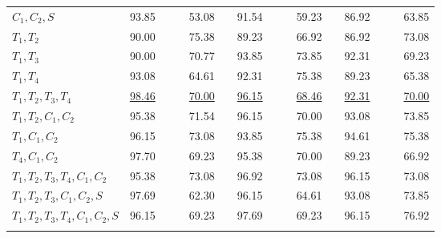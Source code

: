 \begin{table}
{\begin{tabularx}{1.01\textwidth}{@{}l	lllr	 ll	lllr	 ll	lllr@{}}
	$C_1,C_2,S$ 					& 93.85 						& & & 53.08 & \multicolumn{2}{l}{} &  91.54  & & & 59.23 & \multicolumn{2}{l}{} &  86.92 & & & 63.85 \\
	$T_1,T_2$ 					& 90.00 						& & & 75.38 & \multicolumn{2}{l}{} &  89.23  & & & 66.92 & \multicolumn{2}{l}{} &  86.92 & & & 73.08 \\
	$T_1,T_3$ 					& 90.00 						& & & 70.77 & \multicolumn{2}{l}{} &  93.85  & & & 73.85 & \multicolumn{2}{l}{} &   92.31 & & & 69.23  \\
	$T_1,T_4$ 					& 93.08 						& & & 64.61 & \multicolumn{2}{l}{} &  92.31  & & & 75.38 & \multicolumn{2}{l}{} &  89.23 & & & 65.38  \\
	$T_1,T_2,T_3,T_4$  			& \underline{\cellcolor[gray]{0.8}98.46} &\cellcolor[gray]{0.8} & \cellcolor[gray]{0.8}& \underline{\cellcolor[gray]{0.8}70.00}  & \multicolumn{2}{l}{} & \underline{96.15} & & & \underline{68.46} & \multicolumn{2}{l}{} &  \underline{92.31} & & & \underline{70.00}\\
	$T_1,T_2,C_1,C_2$ 			& 95.38 						& & & 71.54  & \multicolumn{2}{l}{} & 96.15 & & & 70.00 & \multicolumn{2}{l}{} &  93.08 & & & 73.85 \\
 	$T_1,C_1,C_2$  				& 96.15						& & & 73.08  & \multicolumn{2}{l}{} & 93.85 & & & 75.38 & \multicolumn{2}{l}{} &  94.61 & & & 75.38 \\ 
 	$T_4,C_1,C_2$ 				& \cellcolor[gray]{0.8}97.70 			& \cellcolor[gray]{0.8}&\cellcolor[gray]{0.8} &\cellcolor[gray]{0.8}69.23  & \multicolumn{2}{l}{} & 95.38 & & & 70.00 & \multicolumn{2}{l}{} &  89.23 & & & 66.92\\
 	$T_1,T_2,T_3,T_4,C_1,C_2$ 	& \cellcolor[gray]{0.8}95.38			&\cellcolor[gray]{0.8} & \cellcolor[gray]{0.8}& \cellcolor[gray]{0.8}73.08  & \multicolumn{2}{l}{} & 96.92 & & & 73.08 & \multicolumn{2}{l}{} &  96.15 & & & 73.08 \\
 	$T_1,T_2,T_3,C_1,C_2,S$ 		& \cellcolor[gray]{0.8}97.69 			&\cellcolor[gray]{0.8} &\cellcolor[gray]{0.8} & \cellcolor[gray]{0.8}62.30  & \multicolumn{2}{l}{} & 96.15 & & & 64.61 & \multicolumn{2}{l}{} &  93.08 & & & 73.85 \\
 	$T_1,T_2,T_3,T_4,C_1,C_2,S$  & 96.15 					& & & 69.23  & \multicolumn{2}{l}{} & \cellcolor[gray]{0.8}97.69 &\cellcolor[gray]{0.8} & \cellcolor[gray]{0.8}& \cellcolor[gray]{0.8}69.23 & \multicolumn{2}{l}{} &  96.15 & & & 76.92\\
 	\multicolumn{17}{l}{}\\
	

\end{tabularx}}
\end{table}
